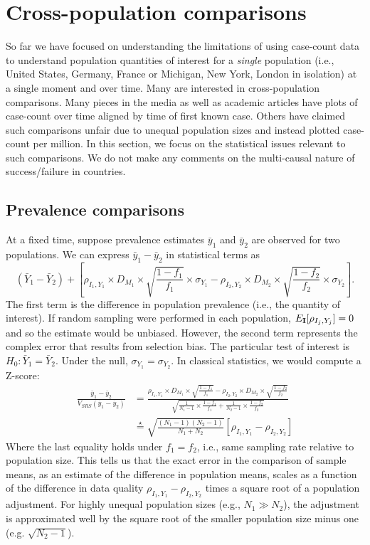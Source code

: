 \documentclass[11pt]{amsart}
\def\I{\bf I}
\begin{document}
\section{Cross-population comparisons}

So far we have focused on understanding the limitations of using case-count data to understand population quantities of interest for a \emph{single} population (i.e., United States, Germany, France or Michigan, New York, London in isolation) at a single moment and over time.  Many are interested in cross-population comparisons.  Many pieces in the media as well as academic articles have plots of case-count over time aligned by time of first known case.  Others have claimed such comparisons unfair due to unequal population sizes and instead plotted case-count per million.  In this section, we focus on the statistical issues relevant to such comparisons. We do not make any comments on the multi-causal nature of success/failure in countries.

\subsection{Prevalence comparisons}

At a fixed time, suppose prevalence estimates $\bar y_1$ and $\bar y_2$ are observed for two populations. We can express $\bar y_1 - \bar y_2$ in statistical terms as
$$
(\bar Y_1 - \bar Y_2) + \left[ \rho_{I_1, Y_1} \times D_{M_1} \times \sqrt{\frac{1-f_1}{f_1}} \times \sigma_{Y_1}  - \rho_{I_2, Y_2} \times D_{M_2} \times \sqrt{\frac{1-f_2}{f_2}} \times \sigma_{Y_2} \right].
$$
The first term is the difference in population prevalence (i.e., the quantity of interest).  If random sampling were performed in each population, $E_{\I} [ \rho_{I_j, Y_j}] = 0$ and so the estimate would be unbiased.  However, the second term represents the complex error that results from selection bias.
The particular test of interest is $H_0: \bar Y_1 = \bar Y_2$.  Under the null, $\sigma_{Y_1} = \sigma_{Y_2}$.  In classical statistics, we would compute a Z-score:
$$
\begin{aligned}
\frac{\bar y_1 - \bar y_2}{ V_{SRS} (\bar y_1 - \bar y_2) } &=
\frac{\rho_{I_1, Y_1} \times D_{M_1} \times \sqrt{\frac{1-f_1}{f_1}}  - \rho_{I_2, Y_2} \times D_{M_2} \times \sqrt{\frac{1-f_2}{f_2}} }{ \sqrt{\frac{1}{N_1 -1} \times \frac{1-f_1}{f_1} + \frac{1}{N_2 - 1} \times \frac{1-f_2}{f_2}} }  \\
&\overset{\star}{=}
\sqrt{\frac{(N_1-1)(N_2 -1)}{N_1 + N_2}} \left[ \rho_{I_1, Y_1} - \rho_{I_2, Y_2} \right]
\end{aligned}
$$
Where the last equality holds under $f_1 = f_2$, i.e., same sampling rate relative to population size. This tells us that the exact error in the comparison of sample means, as an estimate of the difference in population means, scales as a function of the difference in data quality $\rho_{I_1, Y_1} - \rho_{I_2, Y_2}$ times a square root of a population adjustment.  For highly unequal population sizes (e.g., $N_1 \gg N_2$), the adjustment is approximated well by the square root of the smaller population size minus one (e.g. $\sqrt{N_2 -1}$).
\end{document}
